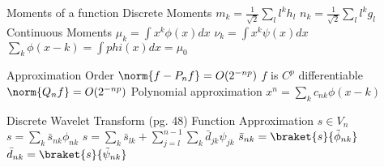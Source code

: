 \documentclass[14pt]{extarticle}
\begin{document}
\begin{outline}
			\2	Moments of a function
				\3	Discrete Moments
					\4	$m_k = \frac{1}{\sqrt{2}} \sum_l l^kh_l$
					\4	$n_k = \frac{1}{\sqrt{2}} \sum_l l^kg_l$
				\3	Continuous Moments
					\4	$\mu_k = \int x^k \phi(x) dx$
					\4	$\nu_k = \int x^k \psi(x) dx$
					\4	$\sum_k \phi(x - k) = \int phi(x) dx = \mu_0$

			\2	Approximation Order
				\3	$\norm{f - P_n f} = O(2^{-np})$
					\4	$f$ is $C^p$ differentiable
				\3	$\norm{Q_nf} = O(2^{-np})$
				\3	Polynomial approximation
					\4	$x^n = \sum_k c_{nk} \phi(x - k)$

		\1	Discrete Wavelet Transform (pg. 48)
			\2	Function Approximation
				\3	$s \in V_n$
				\3	$s = \sum_k \bar{s}_{nk} \phi_{nk}$
				\3	$s = \sum_k \bar{s}_{lk} + \sum_{j=l}^{n-1} \sum_k \bar{d}_{jk}\psi_{jk}$
					\4	$\bar{s}_{nk} = \braket{s}{\tilde{\phi}_{nk}}$
					\4	$\bar{d}_{nk} = \braket{s}{\tilde{\psi}_{nk}}$


\end{outline}
\end{document}
